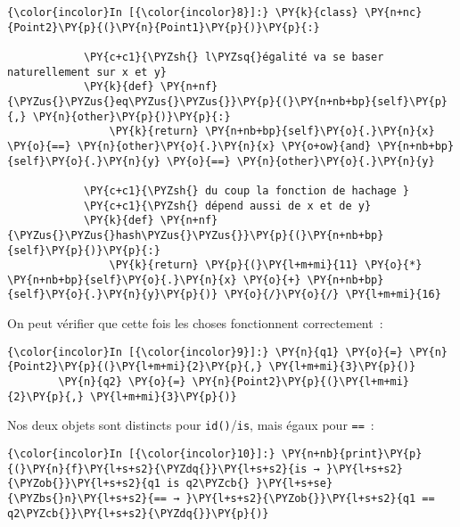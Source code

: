     \begin{Verbatim}[commandchars=\\\{\},frame=single,framerule=0.3mm,rulecolor=\color{cellframecolor}]
{\color{incolor}In [{\color{incolor}8}]:} \PY{k}{class} \PY{n+nc}{Point2}\PY{p}{(}\PY{n}{Point1}\PY{p}{)}\PY{p}{:}
        
            \PY{c+c1}{\PYZsh{} l\PYZsq{}égalité va se baser naturellement sur x et y}
            \PY{k}{def} \PY{n+nf}{\PYZus{}\PYZus{}eq\PYZus{}\PYZus{}}\PY{p}{(}\PY{n+nb+bp}{self}\PY{p}{,} \PY{n}{other}\PY{p}{)}\PY{p}{:}
                \PY{k}{return} \PY{n+nb+bp}{self}\PY{o}{.}\PY{n}{x} \PY{o}{==} \PY{n}{other}\PY{o}{.}\PY{n}{x} \PY{o+ow}{and} \PY{n+nb+bp}{self}\PY{o}{.}\PY{n}{y} \PY{o}{==} \PY{n}{other}\PY{o}{.}\PY{n}{y}
        
            \PY{c+c1}{\PYZsh{} du coup la fonction de hachage }
            \PY{c+c1}{\PYZsh{} dépend aussi de x et de y}
            \PY{k}{def} \PY{n+nf}{\PYZus{}\PYZus{}hash\PYZus{}\PYZus{}}\PY{p}{(}\PY{n+nb+bp}{self}\PY{p}{)}\PY{p}{:}
                \PY{k}{return} \PY{p}{(}\PY{l+m+mi}{11} \PY{o}{*} \PY{n+nb+bp}{self}\PY{o}{.}\PY{n}{x} \PY{o}{+} \PY{n+nb+bp}{self}\PY{o}{.}\PY{n}{y}\PY{p}{)} \PY{o}{/}\PY{o}{/} \PY{l+m+mi}{16}
\end{Verbatim}


    On peut vérifier que cette fois les choses fonctionnent correctement~:

    \begin{Verbatim}[commandchars=\\\{\},frame=single,framerule=0.3mm,rulecolor=\color{cellframecolor}]
{\color{incolor}In [{\color{incolor}9}]:} \PY{n}{q1} \PY{o}{=} \PY{n}{Point2}\PY{p}{(}\PY{l+m+mi}{2}\PY{p}{,} \PY{l+m+mi}{3}\PY{p}{)}
        \PY{n}{q2} \PY{o}{=} \PY{n}{Point2}\PY{p}{(}\PY{l+m+mi}{2}\PY{p}{,} \PY{l+m+mi}{3}\PY{p}{)}
\end{Verbatim}


    Nos deux objets sont distincts pour \texttt{id()}/\texttt{is}, mais
égaux pour \texttt{==}~:

    \begin{Verbatim}[commandchars=\\\{\},frame=single,framerule=0.3mm,rulecolor=\color{cellframecolor}]
{\color{incolor}In [{\color{incolor}10}]:} \PY{n+nb}{print}\PY{p}{(}\PY{n}{f}\PY{l+s+s2}{\PYZdq{}}\PY{l+s+s2}{is → }\PY{l+s+s2}{\PYZob{}}\PY{l+s+s2}{q1 is q2\PYZcb{} }\PY{l+s+se}{\PYZbs{}n}\PY{l+s+s2}{== → }\PY{l+s+s2}{\PYZob{}}\PY{l+s+s2}{q1 == q2\PYZcb{}}\PY{l+s+s2}{\PYZdq{}}\PY{p}{)}
\end{Verbatim}


